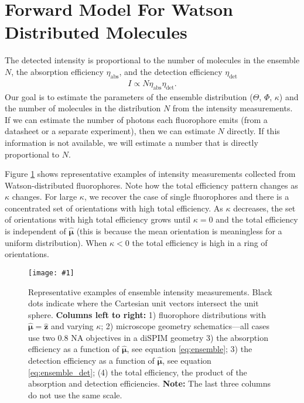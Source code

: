 \documentclass[11pt]{article}
\providecommand{\mb}[1]{\mathbf{#1}}
\providecommand{\bs}[1]{\boldsymbol{#1}}
\providecommand{\fig}[4]{
\begin{figure}[h]
 \captionsetup{width=1.0\linewidth}
 \centering
 \texttt{[image: \#1]}
 \caption{#3}
 \label{fig:#4}
\end{figure}
}
\begin{document}
\section{Forward Model For Watson Distributed Molecules}
The detected intensity is proportional to the number of molecules in the
ensemble $N$, the absorption efficiency $\eta_{\text{abs}}$, and the detection
efficiency $\eta_{\text{det}}$
\begin{align}
  I \propto N\eta_{\text{abs}}\eta_{\text{det}}. 
\end{align}
Our goal is to estimate the parameters of the ensemble distribution
($\Theta$, $\Phi$, $\kappa$) and the number of molecules in the distribution $N$
from the intensity measurements. If we can estimate the number of photons each
fluorophore emits (from a datasheet or a separate experiment), then we can
estimate $N$ directly. If this information is not available, we will estimate a
number that is directly proportional to $N$.

Figure \ref{fig:single-frame} shows representative examples of intensity
measurements collected from Watson-distributed fluorophores. Note how the total
efficiency pattern changes as $\kappa$ changes. For large $\kappa$, we recover
the case of single fluorophores and there is a concentrated set of orientations
with high total efficiency. As $\kappa$ decreases, the set of orientations with
high total efficiency grows until $\kappa = 0$ and the total efficiency is
independent of $\bs{\hat{\mu}}$ (this is because the mean orientation is
meaningless for a uniform distribution). When $\kappa < 0$ the total efficiency
is high in a ring of orientations.

\fig{../figures/single-frame.pdf}{1.0}{Representative examples of ensemble
  intensity measurements. Black dots indicate where the Cartesian unit vectors
  intersect the unit sphere. \newline \newline \textbf{Columns left to right:}
  1) fluorophore distributions with $\bs{\hat{\mu}} = \mb{\hat{z}}$ and varying
  $\kappa$; 2) microscope geometry schematics---all cases use two 0.8 NA
  objectives in a diSPIM geometry 3) the absorption efficiency as a function of
  $\bs{\hat{\mu}}$, see equation \ref{eq:ensemble}; 3) the detection efficiency
  as a function of $\bs{\hat{\mu}}$, see equation \ref{eq:ensemble_det}; (4) the
  total efficiency, the product of the absorption and detection
  efficiencies. \textbf{Note:} The last three columns do not use the same
  scale.}{single-frame}
\end{document}
